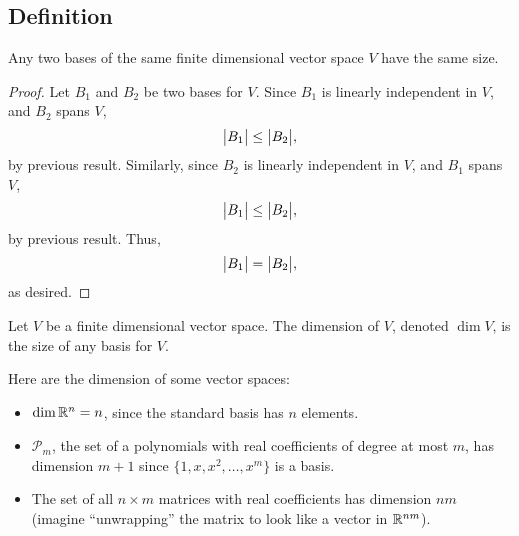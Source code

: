 \subsection{Definition}
\begin{theorem}
	Any two bases of the same finite dimensional vector space $V$ have the same size.
\end{theorem}
\begin{proof}
	Let $B_1$ and $B_2$ be two bases for $V$.
	Since $B_1$ is linearly independent in $V$, and $B_2$ spans $V$,
	\begin{equation*}
		\big\lvert B_1 \big\rvert \leq \big\lvert B_2 \big\rvert,
	\end{equation*}
	by previous result.
	Similarly, since $B_2$ is linearly independent in $V$, and $B_1$ spans $V$,
	\begin{equation*}
		\big\lvert B_1 \big\rvert \leq \big\lvert B_2 \big\rvert,
	\end{equation*}
	by previous result.
	Thus,
	\begin{equation*}
		\big\lvert B_1 \big\rvert = \big\lvert B_2 \big\rvert,
	\end{equation*}
	as desired.
\end{proof}

\begin{definition}
	Let $V$ be a finite dimensional vector space.
	The dimension of $V$, denoted $\dim{V}$, is the size of any basis for $V$.
\end{definition}

\begin{example}
	Here are the dimension of some vector spaces:
	\begin{itemize}
		\item
		$\dim{\mathbb{R}^n} = n$, since the standard basis has $n$ elements.
		\item
		$\mathcal{P}_m$, the set of a polynomials with real coefficients of degree at most $m$, has dimension $m+1$ since $\{1, x, x^2, \dots, x^m\}$ is a basis.
		\item
		The set of all $n \times m$ matrices with real coefficients has dimension $nm$ (imagine ``unwrapping'' the matrix to look like a vector in $\mathbb{R}^{nm}$).
	\end{itemize}
\end{example}